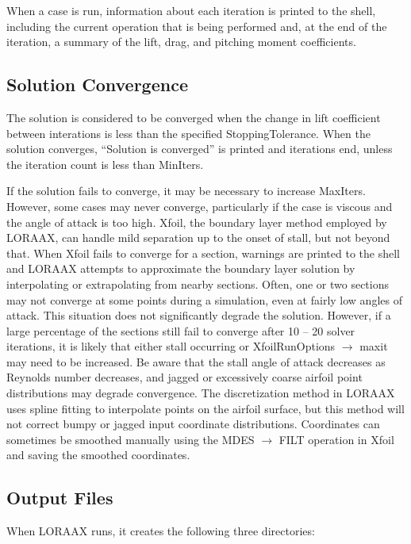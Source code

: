\documentclass[11pt]{article}
\begin{document}
When a case is run, information about each iteration is printed to the shell,
including the current operation that is being performed and, at the end of the
iteration, a summary of the lift, drag, and pitching moment coefficients.

\subsection{Solution Convergence}

The solution is considered to be converged when the change in lift coefficient
between interations is less than the specified StoppingTolerance. When the
solution converges, ``Solution is converged'' is printed and iterations end,
unless the iteration count is less than MinIters.

If the solution fails to converge, it may be necessary to increase MaxIters.
However, some cases may never converge, particularly if the case is viscous and
the angle of attack is too high. Xfoil, the boundary layer method employed by
LORAAX, can handle mild separation up to the onset of stall, but not beyond
that. When Xfoil fails to converge for a section, warnings are printed to the
shell and LORAAX attempts to approximate the boundary layer solution by
interpolating or extrapolating from nearby sections. Often, one or two sections
may not converge at some points during a simulation, even at fairly low angles
of attack. This situation does not significantly degrade the solution. However,
if a large percentage of the sections still fail to converge after 10 -- 20
solver iterations, it is likely that either stall occurring or XfoilRunOptions
$\rightarrow$ maxit may need to be increased. Be aware that the stall angle
of attack decreases as Reynolds number decreases, and jagged or excessively
coarse airfoil point distributions may degrade convergence. The discretization
method in LORAAX uses spline fitting to interpolate points on the airfoil
surface, but this method will not correct bumpy or jagged input
coordinate distributions. Coordinates can sometimes be smoothed manually
using the MDES $\rightarrow$ FILT
operation in Xfoil and saving the smoothed coordinates.

\subsection{Output Files}\label{sec:output}

When LORAAX runs, it creates the following three directories:
\end{document}
